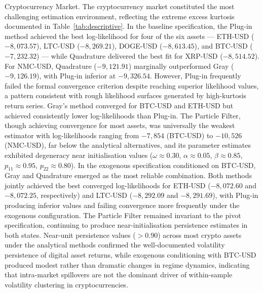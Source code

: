 \documentclass[12pt, a4paper]{article}
\begin{document}
Cryptocurrency Market.
The cryptocurrency market constituted the most challenging estimation environment, reflecting the extreme excess kurtosis documented in Table~\ref{tab:descriptive}. In the baseline specification, the Plug-in method achieved the best log-likelihood for four of the six assets — ETH-USD ($-8{,}073.57$), LTC-USD ($-8{,}269.21$), DOGE-USD ($-8{,}613.45$), and BTC-USD ($-7{,}232.32$) — while Quadrature delivered the best fit for XRP-USD ($-8{,}514.52$). For NMC-USD, Quadrature ($-9{,}121.91$) marginally outperformed Gray ($-9{,}126.19$), with Plug-in inferior at $-9{,}326.54$. However, Plug-in frequently failed the formal convergence criterion despite reaching superior likelihood values, a pattern consistent with rough likelihood surfaces generated by high-kurtosis return series. Gray's method converged for BTC-USD and ETH-USD but achieved consistently lower log-likelihoods than Plug-in. The Particle Filter, though achieving convergence for most assets, was universally the weakest estimator with log-likelihoods ranging from $-7{,}854$ (BTC-USD) to $-10{,}526$ (NMC-USD), far below the analytical alternatives, and its parameter estimates exhibited degeneracy near initialisation values ($\omega \approx 0.30$, $\alpha \approx 0.05$, $\beta \approx 0.85$, $p_{11} \approx 0.95$, $p_{22} \approx 0.80$). In the exogenous specification conditioned on BTC-USD, Gray and Quadrature emerged as the most reliable combination. Both methods jointly achieved the best converged log-likelihoods for ETH-USD ($-8{,}072.60$ and $-8{,}072.25$, respectively) and LTC-USD ($-8{,}292.09$ and $-8{,}291.69$), with Plug-in producing inferior values and failing convergence more frequently under the exogenous configuration. The Particle Filter remained invariant to the pivot specification, continuing to produce near-initialisation persistence estimates in both states. Near-unit persistence values ($> 0.90$) across most crypto assets under the analytical methods confirmed the well-documented volatility persistence of digital asset returns, while exogenous conditioning with BTC-USD produced modest rather than dramatic changes in regime dynamics, indicating that intra-market spillovers are not the dominant driver of within-sample volatility clustering in cryptocurrencies.
\end{document}
